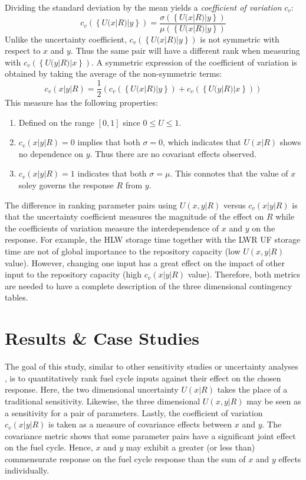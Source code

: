 \documentclass[a4paper, 12pt]{article}
\begin{document}
Dividing the standard deviation by the mean yields a \emph{coefficient of variation} $c_v$:
\begin{equation} c_v(\left\{U(x|R)|y\right\}) = \frac{\sigma(\left\{U(x|R)|y\right\})}{\mu(\left\{U(x|R)|y\right\})} \end{equation}
Unlike the uncertainty coefficient, $c_v(\left\{U(x|R)|y\right\})$ is not symmetric with respect to $x$ and $y$.  
Thus the same pair will have a different rank when measuring
with $c_v(\left\{U(y|R)|x\right\})$.  A symmetric expression of the coefficient of variation is obtained by taking 
the average of the non-symmetric terms:
\begin{equation} c_v(x|y|R) = \frac{1}{2} \left(c_v(\left\{U(x|R)|y\right\}) + c_v(\left\{U(y|R)|x\right\})\right) \end{equation}
This measure has the following properties:
\begin{enumerate}
    \item Defined on the range $[0, 1]$ since $0 \le U \le 1$.
    \item $c_v(x|y|R) = 0$ implies that both $\sigma = 0$, which indicates that $U(x|R)$
        shows no dependence on $y$.  Thus there are no covariant effects observed.
    \item $c_v(x|y|R) = 1$ indicates that both $\sigma = \mu$.  This connotes
        that the value of $x$ soley governs the response $R$ from $y$.
\end{enumerate}

The difference in ranking parameter pairs using $U(x,y|R)$ versus $c_v(x|y|R)$ is that the uncertainty 
coefficient measures the magnitude
of the effect on $R$ while the coefficients of variation measure the interdependence of $x$ and $y$ on 
the response.
For example, the HLW storage time together with the LWR UF storage time are not of global importance to 
the repository capacity (low $U(x,y|R)$ value).
However, changing one input has a great effect on the impact of other input to the repository capacity 
(high $c_v(x|y|R)$ value).
Therefore, both metrics are needed to have a complete description of the three dimensional contingency tables.



\section{Results \& Case Studies}
\label{sec:results}

The goal of this study, similar to other sensitivity studies \cite{Scopatz2010b} or uncertainty 
analyses \cite{Barratt2004}, is to quantitatively rank fuel cycle inputs against their effect on 
the chosen response.  Here, the two dimensional uncertainty $U(x|R)$ takes the place of a 
traditional sensitivity.  Likewise, the three dimensional $U(x,y|R)$ may be seen as a sensitivity 
for a pair of parameters.  Lastly, the coefficient of variation $c_v(x|y|R)$ is taken as a 
measure of covariance effects between $x$ and $y$.  The covariance metric shows that some parameter 
pairs have a significant joint effect on the fuel cycle. Hence, $x$ and $y$ may exhibit a greater 
(or less than) commensurate response on the fuel cycle response than the sum of $x$ and $y$ effects individually.
\end{document}
